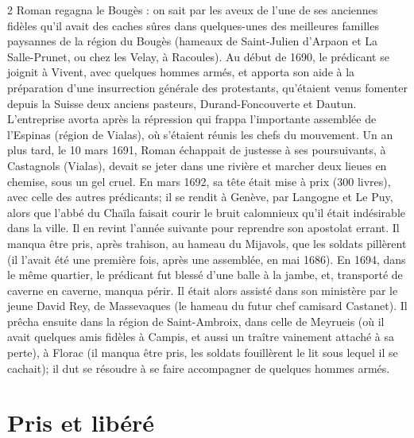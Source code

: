 {\begin{multicols}{2}
Roman regagna le Bougès : on sait par les aveux de l’une de ses anciennes fidèles qu’il avait des caches sûres dans quelques-unes des meilleures familles paysannes de la région du Bougès (hameaux de Saint-Julien d’Arpaon et La Salle-Prunet, ou chez les Velay, à Racoules). Au début de 1690, le prédicant se joignit à Vivent, avec quelques hommes armés, et apporta son aide à la préparation d’une insurrection générale des protestants, qu’étaient venus fomenter depuis la Suisse deux anciens pasteurs, Durand-Foncouverte et Dautun. L’entreprise avorta après la répression qui frappa l’importante assemblée de l’Espinas (région de Vialas), où s’étaient réunis les chefs du mouvement. Un an plus tard, le 10 mars 1691, Roman échappait de justesse à ses poursuivants, à Castagnols (Vialas), devait se jeter dans une rivière et marcher deux lieues en chemise, sous un gel cruel. En mars 1692, sa tête était mise à prix (300 livres), avec celle des autres prédicants; il se rendit à Genève, par Langogne et Le Puy, alors que l’abbé du Chaïla faisait courir le bruit calomnieux qu’il était indésirable dans la ville. Il en revint l’année suivante pour reprendre son apostolat errant. Il manqua être pris, après trahison, au hameau du Mijavols, que les soldats pillèrent (il l’avait été une première fois, après une assemblée, en mai 1686). En 1694, dans le même quartier, le prédicant fut blessé d’une balle à la jambe, et, transporté de caverne en caverne, manqua périr. Il était alors assisté dans son ministère par le jeune David Rey, de Massevaques (le hameau du futur chef camisard Castanet). Il prêcha ensuite dans la région de Saint-Ambroix, dans celle de Meyrueis (où il avait quelques amis fidèles à Campis, et aussi un traître vainement attaché à sa perte), à Florac (il manqua être pris, les soldats fouillèrent le lit sous lequel il se cachait); il dut se résoudre à se faire accompagner de quelques hommes armés.

\section*{Pris et libéré}


\end{multicols}}
